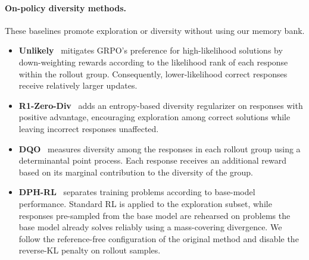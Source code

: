 \documentclass[11pt]{article}
\begin{document}
\paragraph{On-policy diversity methods.}
These baselines promote exploration or diversity without using our memory bank.
\begin{itemize}[leftmargin=*,nosep]
    \item \textbf{Unlikely}~\cite{he2025rewarding} mitigates GRPO's preference for high-likelihood solutions by down-weighting rewards according to the likelihood rank of each response within the rollout group.
    Consequently, lower-likelihood correct responses receive relatively larger updates.

    \item \textbf{R1-Zero-Div}~\cite{yao2025diversity} adds an entropy-based diversity regularizer on responses with positive advantage, encouraging exploration among correct solutions while leaving incorrect responses unaffected.

    \item \textbf{DQO}~\cite{chen2026posttraining} measures diversity among the responses in each rollout group using a determinantal point process.
    Each response receives an additional reward based on its marginal contribution to the diversity of the group.

    \item \textbf{DPH-RL}~\cite{li2026divergence} separates training problems according to base-model performance.
    Standard RL is applied to the exploration subset, while responses pre-sampled from the base model are rehearsed on problems the base model already solves reliably using a mass-covering divergence.
    We follow the reference-free configuration of the original method and disable the reverse-KL penalty on rollout samples.
\end{itemize}
\end{document}
